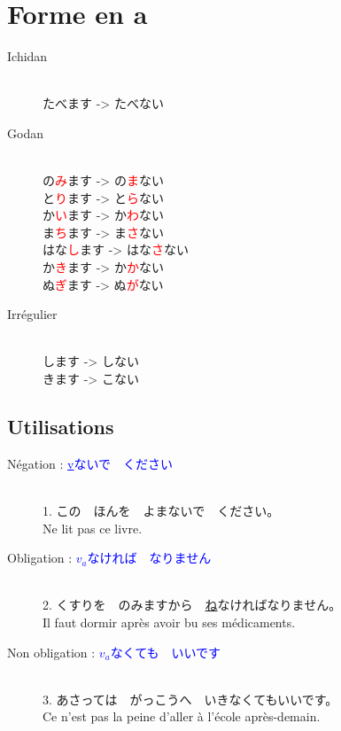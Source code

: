\documentclass[11pt]{report}
\newenvironment{Japanese}{%
\CJKfamily{min}%
\CJKtilde  
\CJKnospace}{}
\begin{document}
\section{Forme en a}

\begin{CJK}{UTF8}{}  
\begin{Japanese}
	\begin{description}
		\item[Ichidan] \hfill \\
			たべます -> たべない
		\item[Godan] \hfill \\
			の\textcolor{red}{み}ます -> の\textcolor{red}{ま}ない \\
			と\textcolor{red}{り}ます -> と\textcolor{red}{ら}ない \\
			か\textcolor{red}{い}ます -> か\textcolor{red}{わ}ない \\
			ま\textcolor{red}{ち}ます -> ま\textcolor{red}{さ}ない \\
			はな\textcolor{red}{し}ます -> はな\textcolor{red}{さ}ない \\
			か\textcolor{red}{き}ます -> か\textcolor{red}{か}ない \\
			ぬ\textcolor{red}{ぎ}ます -> ぬ\textcolor{red}{が}ない
		\item[Irrégulier] \hfill \\
			します -> しない \\
			きます -> こない
	\end{description}
\end{Japanese}  
\end{CJK}

\subsection{Utilisations}

\begin{CJK}{UTF8}{}  
\begin{Japanese}
	\begin{description}
		\item[Négation : \textcolor{blue}{\underline{v}ないで　ください}] \hfill \\
		1. この　ほんを　よまないで　ください。 \\
		Ne lit pas ce livre.
		\item[Obligation : \textcolor{blue}{\underline{$v_{a}$}なければ　なりません}] \hfill \\
		2. くすりを　のみますから　\underline{ね}なければなりません。 \\
		Il faut dormir après avoir bu ses médicaments.
		\item[Non obligation : \textcolor{blue}{\underline{$v_{a}$}なくても　いいです}] \hfill \\
		3. あさっては　がっこうへ　いきなくてもいいです。 \\
		Ce n'est pas la peine d'aller \`a l'école après-demain.
	\end{description}
\end{Japanese}
\end{CJK}
\end{document}
